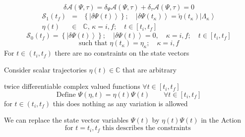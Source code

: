 \documentclass[aps,preprint]{revtex4}
\begin{document}
\begin{equation}
\delta \mathcal{A}\left( \Psi ,\tau \right) =\delta _{\Psi }^{{}}\mathcal{A}%
\left( \Psi ,\tau \right) +\delta _{\tau }\mathcal{A}\left( \Psi ,\tau
\right) =0
\end{equation}%
\begin{eqnarray}
\mathcal{S}_{1}\left( t_{f}\right) &=&\left\{ \left| \delta \Psi \left(
t\right) \right\rangle \right\} ;\quad \left| \delta \Psi \left( t_{\kappa
}\right) \right\rangle =\tilde{\eta}\left( t_{\kappa }\right) \left| \Lambda
_{\kappa }\right\rangle \\
\eta \left( t\right) &\in &\mathbb{C},\,\kappa =i,f;\quad t\in \left[
t_{i},t_{f}\right]
\end{eqnarray}%
\begin{equation}
\mathcal{S}_{0}\left( t_{f}\right) =\left\{ \left| \delta \Psi \left(
t\right) \right\rangle \right\} ;\quad \left| \delta \Psi \left( t\right)
\right\rangle =0,\quad \kappa =i,f;\quad t\in \left[ t_{i},t_{f}\right]
\end{equation}%
\begin{equation}
\text{such that }\eta \left( t_{\kappa }\right) =\eta _{\kappa };\quad
\kappa =i,f
\end{equation}%
For $t\in \left( t_{i},t_{f}\right) $ there are no constraints on the state
vectors

Consider scalar trajectories $\eta \left( t\right) \in \mathbb{C}$ that are
arbitrary

twice differentiable complex valued functions $\forall t\in \left[
t_{i},t_{f}\right] $%
\begin{equation}
\text{Define }\Psi \left( \eta ,t\right) =\eta \left( t\right) \Psi \left(
t\right) \qquad \forall t\in \left[ t_{i},t_{f}\right]
\end{equation}%
for $t\in \left( t_{i},t_{f}\right) $ this does nothing as any variation is
allowed

We can replace the state vector variables $\Psi \left( t\right) $ by $\eta
\left( t\right) \Psi \left( t\right) $ in the Action%
\begin{equation}
\text{for }t=t_{i},t_{f}\text{ this describes the constraints }
\end{equation}
\end{document}

